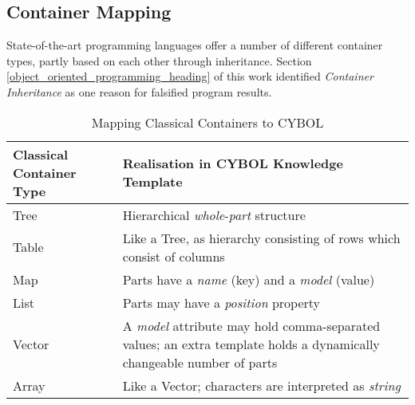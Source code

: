 %
%
%
%
%
%
%

\subsection{Container Mapping}
\label{container_mapping_heading}

State-of-the-art programming languages offer a number of different container
types, partly based on each other through inheritance. Section
\ref{object_oriented_programming_heading} of this work identified
\emph{Container Inheritance} as one reason for falsified program results.

\begin{table}[ht]
    \begin{center}
        \begin{footnotesize}
        \begin{tabular}{| p{35mm} | p{70mm} |}
            \hline
            \textbf{Classical Container Type} & \textbf{Realisation in CYBOL Knowledge Template}\\
            \hline
            Tree & Hierarchical \emph{whole}-\emph{part} structure\\
            \hline
            Table & Like a Tree, as hierarchy consisting of rows which consist of columns\\
            \hline
            Map & Parts have a \emph{name} (key) and a \emph{model} (value)\\
            \hline
            List & Parts may have a \emph{position} property\\
            \hline
            Vector & A \emph{model} attribute may hold comma-separated values;
                an extra template holds a dynamically changeable number of parts\\
            \hline
            Array & Like a Vector; characters are interpreted as \emph{string}\\
            \hline
        \end{tabular}
        \end{footnotesize}
        \caption{Mapping Classical Containers to CYBOL}
        \label{mapping_table}
    \end{center}
\end{table}

